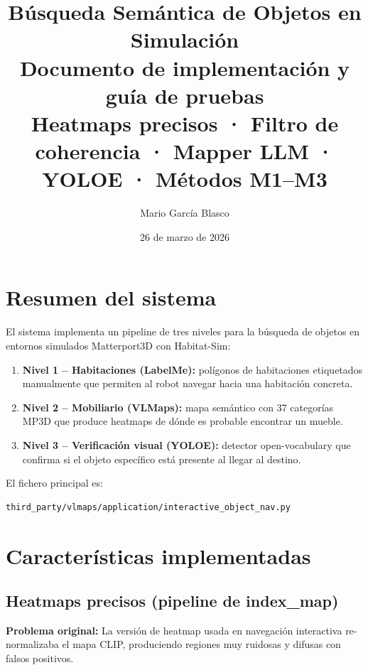\documentclass[11pt,a4paper]{article}
\title{\textbf{Búsqueda Semántica de Objetos en Simulación}\\[0.3cm]
\large Documento de implementación y guía de pruebas\\[0.2cm]
\normalsize Heatmaps precisos · Filtro de coherencia · Mapper LLM · YOLOE · Métodos M1--M3}
\author{Mario García Blasco}
\date{26 de marzo de 2026}
\begin{document}
\maketitle
\tableofcontents
\newpage

\section{Resumen del sistema}

El sistema implementa un pipeline de tres niveles para la búsqueda de objetos en
entornos simulados Matterport3D con Habitat-Sim:

\begin{enumerate}
  \item \textbf{Nivel 1 -- Habitaciones (LabelMe):} polígonos de habitaciones etiquetados
        manualmente que permiten al robot navegar hacia una habitación concreta.
  \item \textbf{Nivel 2 -- Mobiliario (VLMaps):} mapa semántico con 37 categorías MP3D
        que produce heatmaps de dónde es probable encontrar un mueble.
  \item \textbf{Nivel 3 -- Verificación visual (YOLOE):} detector open-vocabulary que
        confirma si el objeto específico está presente al llegar al destino.
\end{enumerate}

El fichero principal es:
\begin{lstlisting}
third_party/vlmaps/application/interactive_object_nav.py
\end{lstlisting}

\section{Características implementadas}

\subsection{Heatmaps precisos (pipeline de index\_map)}

\textbf{Problema original:} La versión de heatmap usada en navegación interactiva
re-normalizaba el mapa CLIP, produciendo regiones muy ruidosas y difusas con
falsos positivos.
\end{document}
